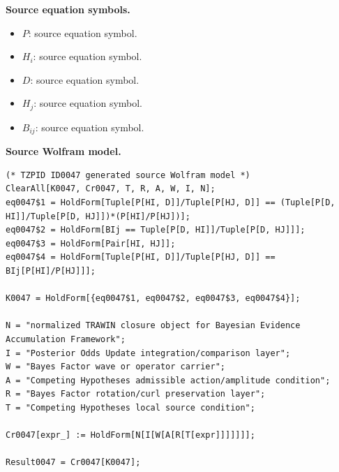 \begin{minipage}[t]{0.49\linewidth}
\begingroup
\small
\raggedright
\textbf{Source equation symbols.}\par
\begin{itemize}[leftmargin=1.35em,itemsep=1pt,topsep=1pt,parsep=0pt]
    \item $P$: source equation symbol.
    \item $H_{i}$: source equation symbol.
    \item $D$: source equation symbol.
    \item $H_{j}$: source equation symbol.
    \item $B_{ij}$: source equation symbol.
\end{itemize}
\endgroup
\end{minipage}\hfill
\begin{minipage}[t]{0.47\linewidth}
\begingroup
\scriptsize
\raggedright
\textbf{Source Wolfram model.}\par
\begin{Verbatim}[fontsize=\tiny,breaklines=true,breakanywhere=true]
(* TZPID ID0047 generated source Wolfram model *)
ClearAll[K0047, Cr0047, T, R, A, W, I, N];
eq0047$1 = HoldForm[Tuple[P[HI, D]]/Tuple[P[HJ, D]] == (Tuple[P[D, HI]]/Tuple[P[D, HJ]])*(P[HI]/P[HJ])];
eq0047$2 = HoldForm[BIj == Tuple[P[D, HI]]/Tuple[P[D, HJ]]];
eq0047$3 = HoldForm[Pair[HI, HJ]];
eq0047$4 = HoldForm[Tuple[P[HI, D]]/Tuple[P[HJ, D]] == BIj[P[HI]/P[HJ]]];

K0047 = HoldForm[{eq0047$1, eq0047$2, eq0047$3, eq0047$4}];

N = "normalized TRAWIN closure object for Bayesian Evidence Accumulation Framework";
I = "Posterior Odds Update integration/comparison layer";
W = "Bayes Factor wave or operator carrier";
A = "Competing Hypotheses admissible action/amplitude condition";
R = "Bayes Factor rotation/curl preservation layer";
T = "Competing Hypotheses local source condition";

Cr0047[expr_] := HoldForm[N[I[W[A[R[T[expr]]]]]]];

Result0047 = Cr0047[K0047];
\end{Verbatim}
\endgroup
\end{minipage}

